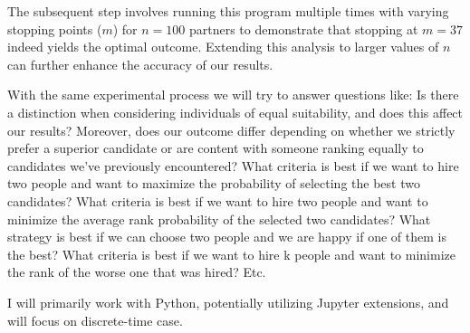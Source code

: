 \documentclass[a4paper,12pt]{article}
\begin{document}
    The subsequent step involves running this program multiple times with varying 
    stopping points ($m$) for $n = 100$ partners to demonstrate that stopping at 
    $m = 37$ indeed yields the optimal outcome. Extending this analysis to larger values of 
    $n$ can further enhance the accuracy of our results.

    With the same experimental process we will try to answer questions like:
    Is there a distinction when considering individuals of equal suitability, 
    and does this affect our results? 
    Moreover, does our outcome differ depending on whether we strictly prefer a 
    superior candidate or are content with someone ranking equally to candidates 
    we've previously encountered?
    What criteria is best if we want to hire two people and want to maximize the 
    probability of selecting the best two candidates? 
    What criteria is best if we want to hire two people and want to minimize the average 
    rank probability of the selected two candidates? 
    What strategy is best if we can choose two people and we are happy if one of them is the best? 
    What criteria is best if we want to hire k people and want to minimize the rank of the worse 
    one that was hired? Etc.


    I will primarily work with Python, potentially utilizing Jupyter extensions, 
    and will focus on discrete-time case. 









 
\end{document}
